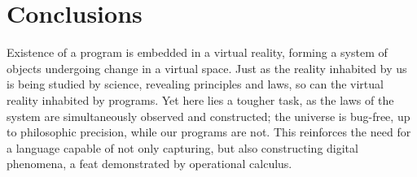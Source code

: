\documentclass{article}
\begin{document}
     
     \section{Conclusions}
     
     Existence of a program is embedded in a virtual reality, forming a system of objects undergoing change in a virtual space. Just as the reality inhabited by us is being studied by science, revealing principles and laws, so can the virtual reality inhabited by programs. Yet here lies a tougher task, as the laws of the system are simultaneously observed and constructed; the universe is bug-free, up to philosophic precision, while our programs are not. This reinforces the need for a language capable of not only capturing, but also constructing digital phenomena, a feat demonstrated by operational calculus. \cite[Section 8]{OperationalCalculus}
  
\clearpage
  \printbibliography
  
\end{document}
